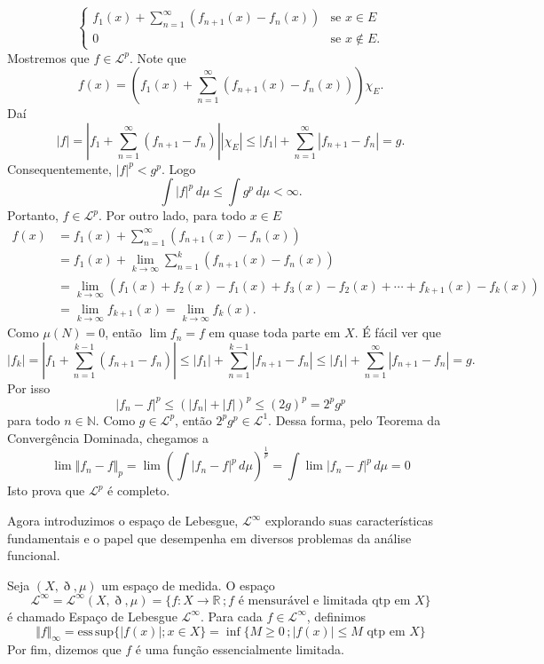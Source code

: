 \documentclass[a4paper, 11pt]{book}
\theoremstyle{definition}
\newcommand{\bN}{\mathbb{N}}
\newcommand{\bR}{\mathbb{R}}
\newcommand{\cL}{\mathcal{L}}
\begin{document}
\begin{prf}
\[        \begin{cases}
            f_1(x) + \sum_{n=1}^{\infty} (f_{n+1}(x) - f_n(x)) &\text{se } x \in E\\
            0 &\text{se } x \not\in E.
        \end{cases}
    \]
    Mostremos que $f \in \cL^p$.
    Note que
    \[
        f(x) = \left( f_1(x) + \sum_{n=1}^{\infty} (f_{n+1}(x) - f_n(x)) \right) \chi_E.
    \]
    Daí
    \[
        |f| = \left| f_1 + \sum_{n=1}^{\infty} (f_{n+1} - f_n) \right| |\chi_E| \leqslant |f_1| + \sum_{n=1}^{\infty}|f_{n+1} - f_n| = g.
    \]
    Consequentemente, $|f|^p < g^p$.
    Logo
    \[
        \int |f|^p \,d\mu \leqslant \int g^p \,d\mu < \infty.
    \]
    Portanto, $f \in \cL^p$.
    Por outro lado, para todo $x \in E$
    \[
        \begin{aligned}
            f(x) &= f_1(x) + \sum_{n=1}^{\infty} (f_{n+1}(x) - f_n(x))\\
            &= f_1(x) + \lim_{k\to \infty}\sum_{n=1}^{k} (f_{n+1}(x) - f_n(x))\\
            &= \lim_{k\to \infty} \left( f_1(x) + f_2(x) - f_1(x) + f_3(x) - f_2(x) + \cdots + f_{k+1}(x) - f_k(x)\right)\\[5pt]
            &= \lim_{k\to \infty} f_{k+1}(x) = \lim _{k\to \infty} f_{k}(x).
        \end{aligned}
    \]
    Como $\mu(N) = 0$, então $\lim f_n = f$ em quase toda parte em $X$.
    É fácil ver que
    \begin{equation}
        |f_k| = \left| f_1 + \sum_{n=1}^{k-1} (f_{n+1} - f_n) \right| \leqslant |f_1| + \sum_{n=1}^{k-1} |f_{n+1} - f_n| \leqslant |f_1| + \sum_{n=1}^{\infty} |f_{n+1} - f_n| = g.
    \end{equation}
    Por isso
    \[
        |f_n - f|^p \leqslant (|f_n| + |f|)^p \leqslant (2g)^p = 2^p g^p
    \]
    para todo $n \in \bN$.
    Como $g \in \cL^p$, então $2^p g^p \in \cL^1$.
    Dessa forma, pelo Teorema da Convergência Dominada, chegamos a
    \[
        \lim \Vert f_n - f \Vert_p = \lim \left( \int |f_n - f|^p \, d\mu \right)^\frac{1}{p} = \int \lim |f_n - f|^p \, d\mu = 0
    \]
    Isto prova que $\cL^p$ é completo.
\end{prf}

Agora introduzimos o espaço de Lebesgue, $\cL^\infty$ explorando suas características fundamentais e o papel que desempenha em diversos problemas da análise funcional.

\begin{dbox}
    Seja $(X,\eth,\mu)$ um espaço de medida. O espaço
    \[
        \cL^\infty = \cL^\infty(X,\eth,\mu) = \{f : X\to \bR \,; f \text{ é mensurável e limitada qtp em } X\}
    \]
    é chamado Espaço de Lebesgue $\cL^\infty$.
    Para cada $f \in \cL^\infty$, definimos
    \[
        \Vert f \Vert_\infty = \mathrm{ess\,sup} \{|f(x)|; x \in X\} =\inf \{M \geqslant 0 \,; |f(x)| \leqslant M \text{ qtp em } X\}
    \]
    Por fim, dizemos que $f$ é uma função essencialmente limitada.
\end{dbox}
\end{document}
